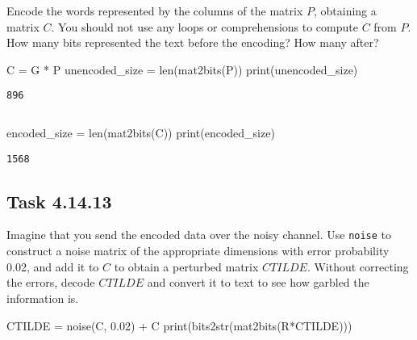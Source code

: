 \documentclass[
  letterpaper,
  DIV=11,
  numbers=noendperiod]{scrartcl}
\newenvironment{Shaded}{\begin{snugshade}}{\end{snugshade}}
\newcommand{\BuiltInTok}[1]{\textcolor[rgb]{0.00,0.23,0.31}{#1}}
\newcommand{\FloatTok}[1]{\textcolor[rgb]{0.68,0.00,0.00}{#1}}
\newcommand{\NormalTok}[1]{\textcolor[rgb]{0.00,0.23,0.31}{#1}}
\newcommand{\OperatorTok}[1]{\textcolor[rgb]{0.37,0.37,0.37}{#1}}
\begin{document}
Encode the words represented by the columns of the matrix \(P\),
obtaining a matrix \(C\). You should not use any loops or comprehensions
to compute \(C\) from \(P\). How many bits represented the text before
the encoding? How many after?

\begin{Shaded}
\begin{Highlighting}[numbers=left,,]
\NormalTok{C }\OperatorTok{=}\NormalTok{ G }\OperatorTok{*}\NormalTok{ P}
\NormalTok{unencoded\_size }\OperatorTok{=} \BuiltInTok{len}\NormalTok{(mat2bits(P))}
\BuiltInTok{print}\NormalTok{(unencoded\_size)}
\end{Highlighting}
\end{Shaded}

\begin{lstlisting}
896
\end{lstlisting}

\begin{lstlisting}
\end{lstlisting}

\begin{Shaded}
\begin{Highlighting}[numbers=left,,]
\NormalTok{encoded\_size }\OperatorTok{=} \BuiltInTok{len}\NormalTok{(mat2bits(C))}
\BuiltInTok{print}\NormalTok{(encoded\_size)}
\end{Highlighting}
\end{Shaded}

\begin{lstlisting}
1568
\end{lstlisting}

\hypertarget{task-4.14.13}{%
\subsection{Task 4.14.13}\label{task-4.14.13}}

Imagine that you send the encoded data over the noisy channel. Use
\texttt{noise} to construct a noise matrix of the appropriate dimensions
with error probability 0.02, and add it to \(C\) to obtain a perturbed
matrix \(CTILDE\). Without correcting the errors, decode \(CTILDE\) and
convert it to text to see how garbled the information is.

\begin{Shaded}
\begin{Highlighting}[numbers=left,,]
\NormalTok{CTILDE }\OperatorTok{=}\NormalTok{ noise(C, }\FloatTok{0.02}\NormalTok{) }\OperatorTok{+}\NormalTok{ C}
\BuiltInTok{print}\NormalTok{(bits2str(mat2bits(R}\OperatorTok{*}\NormalTok{CTILDE)))}
\end{Highlighting}
\end{Shaded}
\end{document}
